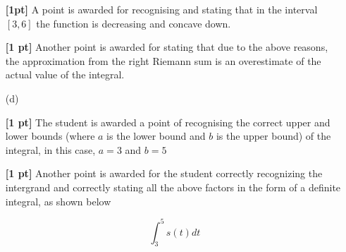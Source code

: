 \documentclass{article}
\newcommand{\qspace}{\vspace*{1.7em}}
\begin{document}
\begin{enumerate}
                \textbf{[1pt]} A point is awarded for recognising and stating that in the interval $[3, 6]$ the function is 
                decreasing and concave down.

                \textbf{[1 pt]} Another point is awarded for stating that due to the above reasons, the approximation from the 
                right Riemann sum is an overestimate of the actual value of the integral. \qspace
        
        \item[(d)] 
        
                \textbf{[1 pt]} The student is awarded a point of recognising the correct upper and lower bounds (where $a$ is the lower bound and $b$ is the upper bound) 
                of the integral, in this case, $a=3$ and $b=5$

                \textbf{[1 pt]} Another point is awarded for the student correctly recognizing the intergrand and correctly
                stating all the above factors in the form of a definite integral, as shown below

                \[
                    \int_3^5 s(t)dt    
                \]
		
    \end{enumerate}
\end{document}
